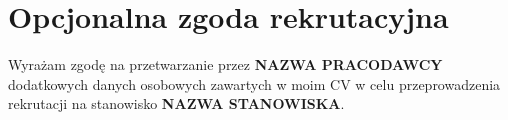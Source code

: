 \documentclass[11pt,a4paper]{article}
\newcommand{\pracodawca}{NAZWA PRACODAWCY}
\newcommand{\stanowisko}{NAZWA STANOWISKA}
\begin{document}
\section{Opcjonalna zgoda rekrutacyjna}
{\small Wyrażam zgodę na przetwarzanie przez \textbf{\pracodawca}
dodatkowych danych osobowych zawartych w moim CV w celu przeprowadzenia
rekrutacji na stanowisko \textbf{\stanowisko}.}
\end{document}
